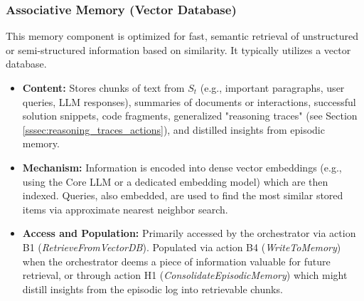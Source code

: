 \documentclass[11pt]{article}
\begin{document}
\subsubsection{Associative Memory (Vector Database)}
\label{sssec:associative_memory}
This memory component is optimized for fast, semantic retrieval of unstructured or semi-structured information based on similarity. It typically utilizes a vector database.
\begin{itemize}
    \item \textbf{Content:} Stores chunks of text from $S_t$ (e.g., important paragraphs, user queries, LLM responses), summaries of documents or interactions, successful solution snippets, code fragments, generalized "reasoning traces" (see Section \ref{sssec:reasoning_traces_actions}), and distilled insights from episodic memory.
    \item \textbf{Mechanism:} Information is encoded into dense vector embeddings (e.g., using the Core LLM or a dedicated embedding model) which are then indexed. Queries, also embedded, are used to find the most similar stored items via approximate nearest neighbor search.
    \item \textbf{Access and Population:} Primarily accessed by the orchestrator via action B1 (\emph{RetrieveFromVectorDB}). Populated via action B4 (\emph{WriteToMemory}) when the orchestrator deems a piece of information valuable for future retrieval, or through action H1 (\emph{ConsolidateEpisodicMemory}) which might distill insights from the episodic log into retrievable chunks.
\end{itemize}
\end{document}
